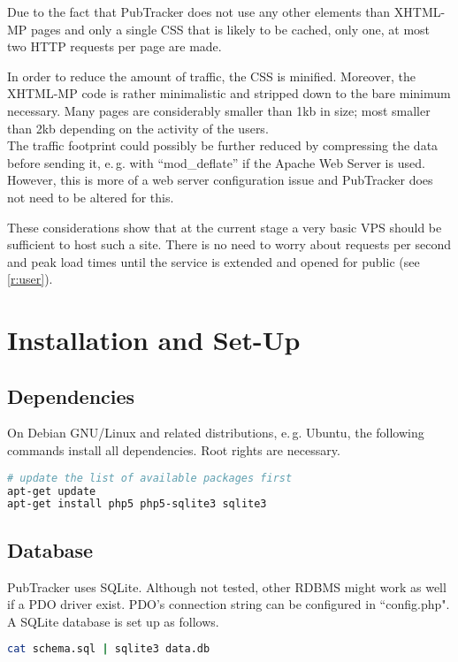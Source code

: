 \documentclass[a4paper,10pt]{scrartcl}
\begin{document}
Due to the fact that PubTracker does not use any other elements than
\ac{XHTML-MP} pages and only a single \ac{CSS} that is likely to be cached, only
one, at most two \ac{HTTP} requests per page are made.

In order to reduce the amount of traffic, the \ac{CSS} is minified. Moreover,
the \ac{XHTML-MP} code is rather minimalistic and stripped down to the bare
minimum necessary. Many pages are considerably smaller than 1kb in size; most
smaller than 2kb depending on the activity of the users.\\
The traffic footprint
could possibly be further reduced by compressing the data before sending it,
e.\,g. with ``mod\_deflate'' if the Apache Web Server is used. However, this is
 more of a web server configuration issue and PubTracker does not need to be
altered for this.

These considerations show that at the current stage a very basic \ac{VPS}
should be sufficient to host such a site. There is no need to worry about
requests per second and peak load times until the service is extended and
opened for public (see \ref{r:user}).

\section{Installation and Set-Up}
\subsection{Dependencies}
On Debian GNU/Linux and related distributions, e.\,g. Ubuntu, the following
commands install all dependencies. Root rights are necessary.
\begin{lstlisting}[language=bash]
# update the list of available packages first
apt-get update
apt-get install php5 php5-sqlite3 sqlite3
\end{lstlisting}

\subsection{Database}
PubTracker uses SQLite. Although not tested, other \acs{RDBMS} might work as
well if a \ac{PDO} driver exist. \ac{PDO}'s connection string can be configured in
``config.php". A SQLite database is set up as follows.

\begin{lstlisting}[language=bash]
cat schema.sql | sqlite3 data.db
\end{lstlisting}
\end{document}
